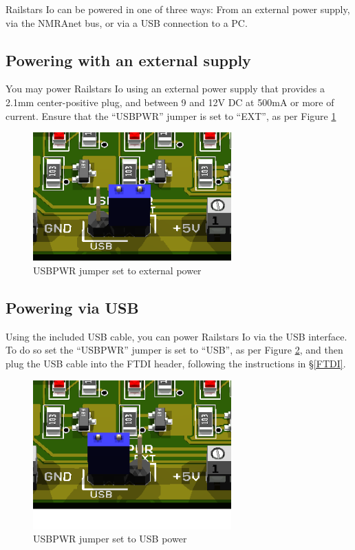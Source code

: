 \documentclass[12pt]{book}
\begin{document}
Railstars Io can be powered in one of three ways: From an external power supply, via the NMRAnet bus, or via a USB connection to a PC.

\subsection{Powering with an external supply}
\label{externalpower}

You may power Railstars Io using an external power supply that provides a 2.1mm center-positive plug, and between 9 and 12V DC at 500mA or more of current. Ensure that the ``USBPWR'' jumper is set to ``EXT'', as per Figure \ref{EXTPWR}

\begin{figure}[htbp]
\begin{center}
\includegraphics[width=3in]{images/IoUSBPowerEXT.png}
\caption{USBPWR jumper set to external power}
\label{EXTPWR}
\end{center}
\end{figure}

\subsection{Powering via USB}

Using the included USB cable, you can power Railstars Io via the USB interface. To do so set the ``USBPWR'' jumper is set to ``USB'', as per Figure \ref{USBPWR}, and then plug the USB cable into the FTDI header, following the instructions in \S\ref{FTDI}.

\begin{figure}[htbp]
\begin{center}
\includegraphics[width=3in]{images/IoUSBPowerUSB.png}
\caption{USBPWR jumper set to USB power}
\label{USBPWR}
\end{center}
\end{figure}
\end{document}
